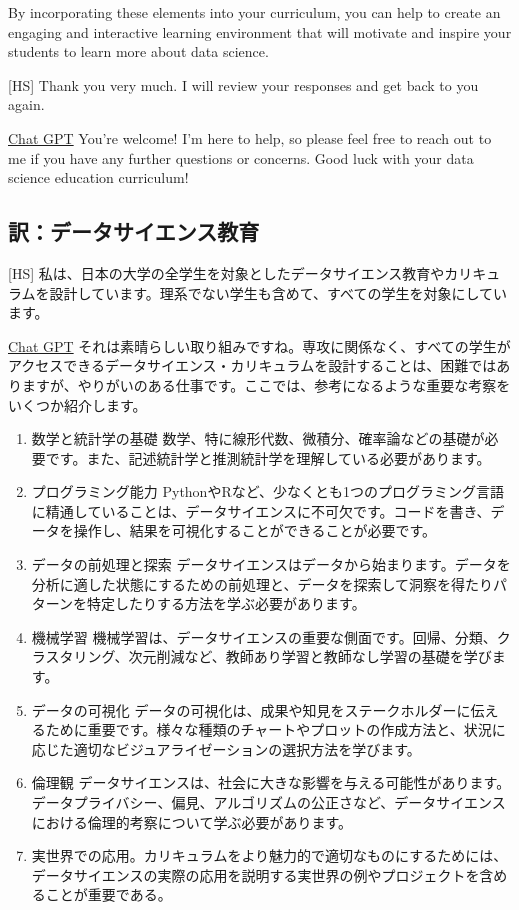 \documentclass[
]{book}
\theoremstyle{definition}
\theoremstyle{definition}
\theoremstyle{definition}
\theoremstyle{definition}
\theoremstyle{remark}
\begin{document}
By incorporating these elements into your curriculum, you can help to create an engaging and interactive learning environment that will motivate and inspire your students to learn more about data science.

{[}HS{]} Thank you very much. I will review your responses and get back to you again.

\protect\hyperlink{chatgpt}{Chat GPT} You're welcome! I'm here to help, so please feel free to reach out to me if you have any further questions or concerns. Good luck with your data science education curriculum!

\hypertarget{dseducationj}{%
\subsection{訳：データサイエンス教育}\label{dseducationj}}

{[}HS{]} 私は、日本の大学の全学生を対象としたデータサイエンス教育やカリキュラムを設計しています。理系でない学生も含めて、すべての学生を対象にしています。

\protect\hyperlink{chatgpt}{Chat GPT} それは素晴らしい取り組みですね。専攻に関係なく、すべての学生がアクセスできるデータサイエンス・カリキュラムを設計することは、困難ではありますが、やりがいのある仕事です。ここでは、参考になるような重要な考察をいくつか紹介します。

\begin{enumerate}
\def\labelenumi{\arabic{enumi}.}
\item
  数学と統計学の基礎 数学、特に線形代数、微積分、確率論などの基礎が必要です。また、記述統計学と推測統計学を理解している必要があります。
\item
  プログラミング能力 PythonやRなど、少なくとも1つのプログラミング言語に精通していることは、データサイエンスに不可欠です。コードを書き、データを操作し、結果を可視化することができることが必要です。
\item
  データの前処理と探索 データサイエンスはデータから始まります。データを分析に適した状態にするための前処理と、データを探索して洞察を得たりパターンを特定したりする方法を学ぶ必要があります。
\item
  機械学習 機械学習は、データサイエンスの重要な側面です。回帰、分類、クラスタリング、次元削減など、教師あり学習と教師なし学習の基礎を学びます。
\item
  データの可視化 データの可視化は、成果や知見をステークホルダーに伝えるために重要です。様々な種類のチャートやプロットの作成方法と、状況に応じた適切なビジュアライゼーションの選択方法を学びます。
\item
  倫理観 データサイエンスは、社会に大きな影響を与える可能性があります。データプライバシー、偏見、アルゴリズムの公正さなど、データサイエンスにおける倫理的考察について学ぶ必要があります。
\item
  実世界での応用。カリキュラムをより魅力的で適切なものにするためには、データサイエンスの実際の応用を説明する実世界の例やプロジェクトを含めることが重要である。
\end{enumerate}
\end{document}
